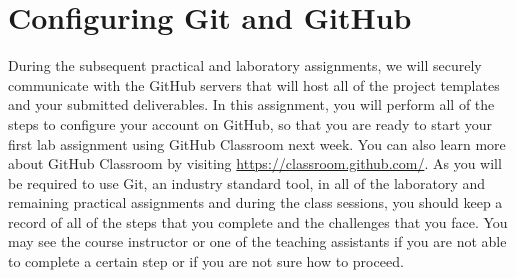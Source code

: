 \vspace*{-.2in}
\section*{Configuring Git and GitHub}
\vspace*{-.1in}

During the subsequent practical and  laboratory assignments, we will securely communicate
with the GitHub servers that will host all of the project templates and your submitted deliverables. In this assignment,
you will perform all of the steps to configure your account on GitHub, so that you are ready to start your first lab assignment using
GitHub Classroom next week.  You can
also learn more about GitHub Classroom by visiting \url{https://classroom.github.com/}. As you will be required to use
Git, an industry standard tool, in all of the  laboratory and remaining practical assignments and during the class
sessions, you should keep a record of all of the steps that you complete and the challenges that you face. You may see
the course instructor or one of the teaching assistants if you are not able to complete a certain step or if you are not
sure how to proceed.

